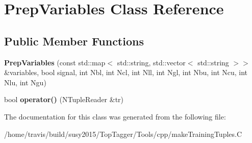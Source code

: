 \hypertarget{classPrepVariables}{\section{Prep\-Variables Class Reference}
\label{classPrepVariables}
}
\subsection*{Public Member Functions}
\begin{DoxyCompactItemize}
\item 
\hypertarget{classPrepVariables_a835f54e7cf4a13a6467a0dd617b339ec}{{\bfseries Prep\-Variables} (const std\-::map$<$ std\-::string, std\-::vector$<$ std\-::string $>$$>$ \&variables, bool signal, int Nbl, int Ncl, int Nll, int Ngl, int Nbu, int Ncu, int Nlu, int Ngu)}\label{classPrepVariables_a835f54e7cf4a13a6467a0dd617b339ec}

\item 
\hypertarget{classPrepVariables_aa9080e1aba478af9311f3017f9e987a7}{bool {\bfseries operator()} (N\-Tuple\-Reader \&tr)}\label{classPrepVariables_aa9080e1aba478af9311f3017f9e987a7}

\end{DoxyCompactItemize}


The documentation for this class was generated from the following file\-:\begin{DoxyCompactItemize}
\item 
/home/travis/build/susy2015/\-Top\-Tagger/\-Tools/cpp/make\-Training\-Tuples.\-C\end{DoxyCompactItemize}
